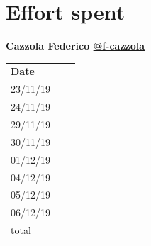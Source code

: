 \documentclass{article}
\begin{document}
\newpage
\section{Effort spent}
	\begin{center}
		{\bf Cazzola Federico \href{https://github.com/f-cazzola}{@f-cazzola} }
		\vspace{2mm}

			\begin{tabular}{p{1.3cm}|p{1.8cm}|p{6.7cm}}
				\hline
				\bf Date & \bf \makebox[1.8cm][c]{Hours} & \bf \makebox[6.7cm][c]{Description} \\
				23/11/19 & \makebox[1.8cm][c]{2} & \makebox[6.7cm][c]{Architectural design}\\
				24/11/19 & \makebox[1.8cm][c]{3} & \makebox[6.7cm][c]{Architectural design}\\
				29/11/19 & \makebox[1.8cm][c]{2} & \makebox[6.7cm][c]{Architectural design}\\
				30/11/19 & \makebox[1.8cm][c]{6} & \makebox[6.7cm][c]{Architectural design}\\
				01/12/19 & \makebox[1.8cm][c]{8} & \makebox[6.7cm][c]{Architectural design}\\
				04/12/19 & \makebox[1.8cm][c]{4} & \makebox[6.7cm][c]{UI design}\\
				05/12/19 & \makebox[1.8cm][c]{6} & \makebox[6.7cm][c]{UI design}\\
				06/12/19 & \makebox[1.8cm][c]{0} & \makebox[6.7cm][c]{}\\
				\hline
				total    & \makebox[1.8cm][c]{31}
			\end{tabular}
	\end{center}
	\vspace{1cm}
\end{document}
